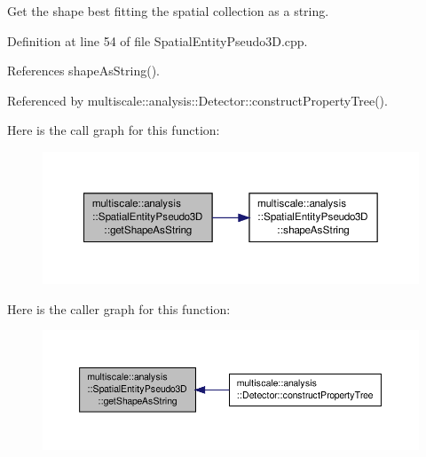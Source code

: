 Get the shape best fitting the spatial collection as a string. 



Definition at line 54 of file Spatial\-Entity\-Pseudo3\-D.\-cpp.



References shape\-As\-String().



Referenced by multiscale\-::analysis\-::\-Detector\-::construct\-Property\-Tree().



Here is the call graph for this function\-:
\nopagebreak
\begin{figure}[H]
\begin{center}
\leavevmode
\includegraphics[width=350pt]{classmultiscale_1_1analysis_1_1SpatialEntityPseudo3D_aaf8b45d68041be0f293eaf1bf40c76d3_cgraph}
\end{center}
\end{figure}




Here is the caller graph for this function\-:
\nopagebreak
\begin{figure}[H]
\begin{center}
\leavevmode
\includegraphics[width=350pt]{classmultiscale_1_1analysis_1_1SpatialEntityPseudo3D_aaf8b45d68041be0f293eaf1bf40c76d3_icgraph}
\end{center}
\end{figure}


